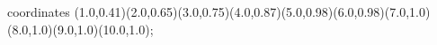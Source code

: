 					coordinates { (1.0,0.41)(2.0,0.65)(3.0,0.75)(4.0,0.87)(5.0,0.98)(6.0,0.98)(7.0,1.0)(8.0,1.0)(9.0,1.0)(10.0,1.0)};
